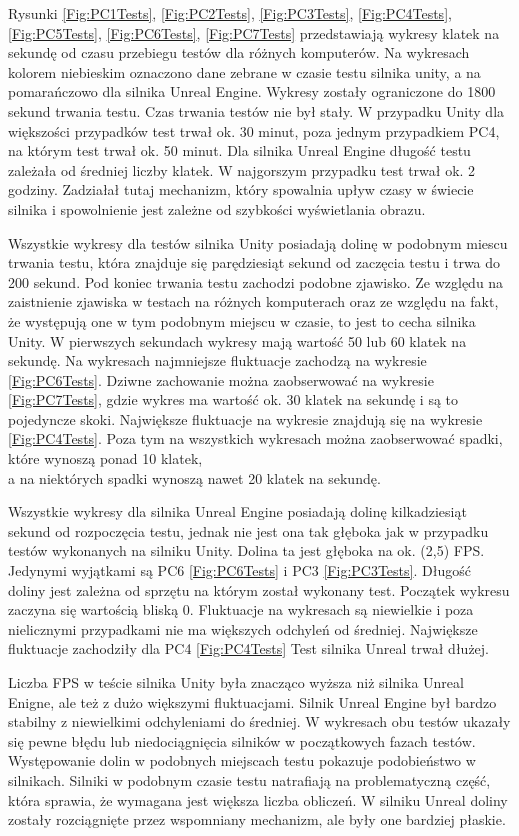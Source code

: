 \documentclass[12pt,twoside]{article}
\begin{document}
Rysunki
\ref{Fig:PC1Tests}, \ref{Fig:PC2Tests}, \ref{Fig:PC3Tests}, \ref{Fig:PC4Tests},
\ref{Fig:PC5Tests}, \ref{Fig:PC6Tests}, \ref{Fig:PC7Tests} przedstawiają wykresy
klatek na sekundę od czasu przebiegu testów dla różnych komputerów. Na wykresach
kolorem niebieskim oznaczono dane zebrane w czasie testu silnika unity, a na
pomarańczowo dla silnika Unreal Engine. Wykresy zostały ograniczone do 1800
sekund trwania testu. Czas trwania testów nie był stały. W przypadku Unity dla
większości przypadków test trwał ok. 30 minut, poza jednym przypadkiem PC4, na
którym test trwał ok. 50 minut. Dla silnika Unreal Engine długość testu zależała
od średniej liczby klatek. W najgorszym przypadku test trwał ok. 2 godziny.
Zadziałał tutaj mechanizm, który spowalnia upływ czasy w świecie silnika i
spowolnienie jest zależne od szybkości wyświetlania obrazu. 

Wszystkie wykresy dla testów silnika Unity posiadają dolinę w podobnym miescu
trwania testu, która znajduje się parędziesiąt sekund od zaczęcia testu i trwa
do 200 sekund. Pod koniec trwania testu zachodzi podobne zjawisko. Ze względu na
zaistnienie zjawiska w testach na różnych komputerach oraz ze względu na fakt,
że występują one w tym podobnym miejscu w czasie, to jest to cecha silnika
Unity. W pierwszych sekundach wykresy mają wartość 50 lub 60 klatek na sekundę.
Na wykresach najmniejsze fluktuacje zachodzą na wykresie \ref{Fig:PC6Tests}.
Dziwne zachowanie można zaobserwować na wykresie \ref{Fig:PC7Tests}, gdzie
wykres ma wartość ok. 30 klatek na sekundę i są to pojedyncze skoki. Największe
fluktuacje na wykresie znajdują się na wykresie \ref{Fig:PC4Tests}. Poza tym na
wszystkich wykresach można zaobserwować spadki, które wynoszą ponad 10 klatek,\\a
na niektórych spadki wynoszą nawet 20 klatek na sekundę. 

Wszystkie wykresy dla silnika Unreal Engine posiadają dolinę kilkadziesiąt
sekund od rozpoczęcia testu, jednak nie jest ona tak głęboka jak w przypadku
testów wykonanych na silniku Unity. Dolina ta jest głęboka na ok. (2,5) FPS.
Jedynymi wyjątkami są PC6 \ref{Fig:PC6Tests} i PC3 \ref{Fig:PC3Tests}. Długość
doliny jest zależna od sprzętu na którym został wykonany test. Początek wykresu
zaczyna się wartością bliską 0. Fluktuacje na wykresach są niewielkie i poza
nielicznymi przypadkami nie ma większych odchyleń od średniej. Największe
fluktuacje zachodziły dla PC4 \ref{Fig:PC4Tests} Test silnika Unreal trwał
dłużej.

Liczba FPS w teście silnika Unity była znacząco wyższa niż silnika Unreal
Enigne, ale też z dużo większymi fluktuacjami. Silnik Unreal Engine był bardzo
stabilny z niewielkimi odchyleniami do średniej. W wykresach obu testów ukazały
się pewne błędu lub niedociągnięcia silników w początkowych fazach testów.
Występowanie dolin w podobnych miejscach testu pokazuje podobieństwo w
silnikach. Silniki w podobnym czasie testu natrafiają na problematyczną część,
która sprawia, że wymagana jest większa liczba obliczeń. W silniku Unreal doliny
zostały rozciągnięte przez wspomniany mechanizm, ale były one bardziej płaskie. 
\end{document}
